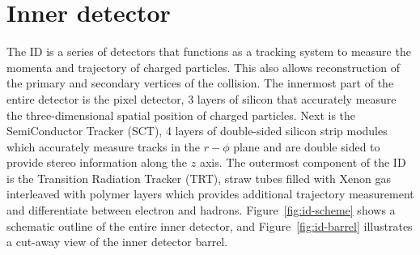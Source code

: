 \section{Inner detector}
The ID is a series of detectors that functions as a tracking system to measure the momenta and trajectory of charged particles. This also allows reconstruction of the primary and secondary vertices of the collision. The innermost part of the entire detector is the pixel detector, 3 layers of silicon that accurately measure the three-dimensional spatial position of charged particles. Next is the SemiConductor Tracker (SCT), 4 layers of double-sided silicon strip modules which accurately measure tracks in the $r-\phi$ plane and are double sided to provide stereo information along the $z$ axis. The outermost component of the ID is the Transition Radiation Tracker (TRT), straw tubes filled with Xenon gas interleaved with polymer layers which provides additional trajectory measurement and differentiate between electron and hadrons. Figure~\ref{fig:id-scheme} shows a schematic outline of the entire inner detector, and Figure~\ref{fig:id-barrel} illustrates a cut-away view of the inner detector barrel.

